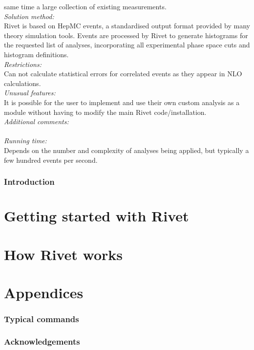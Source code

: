 \documentclass[preprint,12pt]{elsarticle}
\begin{document}
\begin{small}
  same time a large collection of existing measurements.
  \\
  {\em Solution method:}\\
  Rivet is based on HepMC events, a standardised output format provided by many
  theory simulation tools. Events are processed by Rivet to generate histograms
  for the requested list of analyses, incorporating all experimental phase
  space cuts and histogram definitions.
  \\
  {\em Restrictions:}\\
  Can not calculate statistical errors for correlated events as they appear
  in NLO calculations.
  \\
  {\em Unusual features:}\\
  It is possible for the user to implement and use their own custom analysis
  as a module without having to modify the main Rivet code/installation.
  \\
  {\em Additional comments:}\\
  \\
  {\em Running time:}\\
  Depends on the number and complexity of analyses being applied, but typically
  a few hundred events per second.
  \\

\end{small}


\section{Introduction}
\label{sec:intro}


\cleardoublepage

\part{Getting started with Rivet}
\label{part:gettingstarted}


\cleardoublepage

\part{How Rivet works}
\label{part:writinganalyses}


\cleardoublepage

\part{Appendices}
\appendix

\section{Typical  commands}
\label{app:agilerunmc}


\section{Acknowledgements}
\label{app:acknowledgements}



\cleardoublepage



\end{document}
